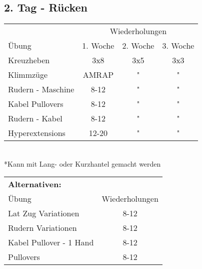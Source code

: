 \documentclass[10pt,a4paper]{article}
\begin{document}
	\subsection{2. Tag - Rücken}
		\begin{tabular}{l||c|c|c}
			& \multicolumn{3}{c}{Wiederholungen} \\ 
			Übung & 1. Woche & 2. Woche & 3. Woche \\ 
			\hline
			\hline 
			Kreuzheben & 3x8 & 3x5 & 3x3 \\ 
			\hline 
			Klimmzüge	& AMRAP & " & " \\ 
			\hline
			Rudern - Maschine & 8-12 & " & " \\ 
			\hline
			Kabel Pullovers & 8-12 & " & " \\ 
			\hline
			Rudern - Kabel	& 8-12	& "	& "	\\
			\hline
			Hyperextensions	& 12-20	& "	& "	\\
		\end{tabular} \\
		*Kann mit Lang- oder Kurzhantel gemacht werden
		\vspace{1cm}\\
		\begin{tabular}{lc}
			\multicolumn{2}{l}{\textbf{Alternativen:}}	\\
			Übung	& Wiederholungen	\\
			\hline
			\midrule
			Lat Zug Variationen	& 8-12 \\
			Rudern Variationen	& 8-12	\\
			Kabel Pullover - 1 Hand	& 8-12	\\
			Pullovers & 8-12	\\ 
		\end{tabular}	\\
\end{document}
